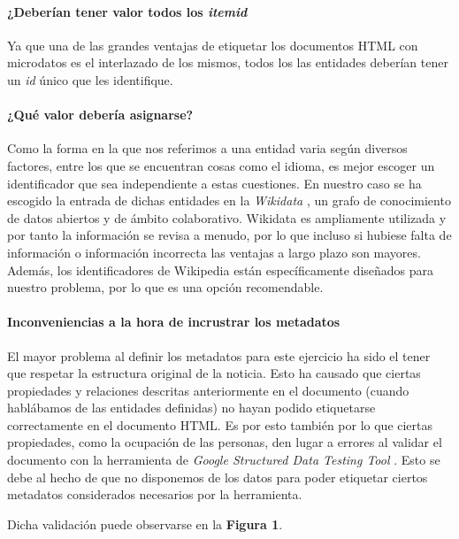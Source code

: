 \documentclass[11pt]{article}
\begin{document}
\paragraph{¿Deberían tener valor todos los \textit{itemid}}
Ya que una de las grandes ventajas de etiquetar los documentos HTML con microdatos es el interlazado de los mismos, todos los las entidades deberían tener un \textit{id} único que les identifique.

\paragraph{¿Qué valor debería asignarse?}
Como la forma en la que nos referimos a una entidad varia según diversos factores, entre los que se encuentran cosas como el idioma, es mejor escoger un identificador que sea independiente a estas cuestiones. En nuestro caso se ha escogido la entrada de dichas entidades en la \textit{Wikidata} \cite{wikidata}, un grafo de conocimiento de datos abiertos y de ámbito colaborativo. Wikidata es ampliamente utilizada y por tanto la información se revisa a menudo, por lo que incluso si hubiese falta de información o información incorrecta las ventajas a largo plazo son mayores. Además, los identificadores de Wikipedia están específicamente diseñados para nuestro problema, por lo que es una opción recomendable.

\paragraph{Inconveniencias a la hora de incrustrar los metadatos}
El mayor problema al definir los metadatos para este ejercicio ha sido el tener que respetar la estructura original de la noticia. Esto ha causado que ciertas propiedades y relaciones descritas anteriormente en el documento (cuando hablábamos de las entidades definidas) no hayan podido etiquetarse correctamente en el documento HTML. Es por esto también por lo que ciertas propiedades, como la ocupación de las personas, den lugar a errores al validar el documento con la herramienta de \textit{Google Structured Data Testing Tool} \cite{googlesdtt}. Esto se debe al hecho de que no disponemos de los datos para poder etiquetar ciertos metadatos considerados necesarios por la herramienta.

Dicha validación puede observarse en la \textbf{Figura 1}.
\end{document}
